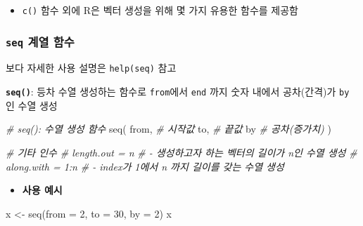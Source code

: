 \documentclass[
  11pt,
]{krantz}
\makeatletter
\newenvironment{Shaded}{\begin{snugshade}}{\end{snugshade}}
\newcommand{\AttributeTok}[1]{\textcolor[rgb]{0.61,0.61,0.61}{#1}}
\newcommand{\CommentTok}[1]{\textcolor[rgb]{0.37,0.37,0.37}{\textit{#1}}}
\newcommand{\DecValTok}[1]{\textcolor[rgb]{0.06,0.06,0.06}{#1}}
\newcommand{\FunctionTok}[1]{\textcolor[rgb]{0,0,0}{#1}}
\newcommand{\NormalTok}[1]{#1}
\newcommand{\OtherTok}[1]{\textcolor[rgb]{0.37,0.37,0.37}{#1}}
\providecommand{\tightlist}{%
  \setlength{\itemsep}{0pt}\setlength{\parskip}{0pt}}
\newenvironment{kframe}{%
\medskip{}
\setlength{\fboxsep}{.8em}
 \def\at@end@of@kframe{}%
 \ifinner\ifhmode%
  \def\at@end@of@kframe{\end{minipage}}%
  \begin{minipage}{\columnwidth}%
 \fi\fi%
 \def\FrameCommand##1{\hskip\@totalleftmargin \hskip-\fboxsep
 \colorbox{shadecolor}{##1}\hskip-\fboxsep
     \hskip-\linewidth \hskip-\@totalleftmargin \hskip\columnwidth}%
 \MakeFramed {\advance\hsize-\width
   \@totalleftmargin\z@ \linewidth\hsize
   \@setminipage}}%
 {\par\unskip\endMakeFramed%
 \at@end@of@kframe}
\renewenvironment{quote}{\begin{kframe}}{\end{kframe}}
\makeatother
\begin{document}
\begin{itemize}
\tightlist
\item
  \texttt{c()} 함수 외에 R은 벡터 생성을 위해 몇 가지 유용한 함수를 제공함
\end{itemize}

\hypertarget{fun-seq}{%
\subsubsection*{\texorpdfstring{\textbf{\texttt{seq}} 계열 함수}{seq 계열 함수}}\label{fun-seq}}


\begin{quote}
보다 자세한 사용 설명은 \texttt{help(seq)} 참고
\end{quote}

\textbf{\texttt{seq()}}: 등차 수열 생성하는 함수로 \texttt{from}에서 \texttt{end} 까지 숫자 내에서 공차(간격)가 \texttt{by} 인 수열 생성

\footnotesize

\begin{Shaded}
\begin{Highlighting}[]
\CommentTok{\# seq(): 수열 생성 함수}
\FunctionTok{seq}\NormalTok{(}
\NormalTok{  from, }\CommentTok{\# 시작값}
\NormalTok{  to,   }\CommentTok{\# 끝값}
\NormalTok{  by    }\CommentTok{\# 공차(증가치)}
\NormalTok{)}

\CommentTok{\# 기타 인수}
\CommentTok{\# length.out = n}
\CommentTok{\#   {-} 생성하고자 하는 벡터의 길이가 n인 수열 생성}
\CommentTok{\# along.with = 1:n }
\CommentTok{\#   {-} index가 1에서 n 까지 길이를 갖는 수열 생성}
\end{Highlighting}
\end{Shaded}

\normalsize

\begin{itemize}
\tightlist
\item
  \textbf{사용 예시}
\end{itemize}

\footnotesize

\begin{Shaded}
\begin{Highlighting}[]
\NormalTok{x }\OtherTok{\textless{}{-}} \FunctionTok{seq}\NormalTok{(}\AttributeTok{from =} \DecValTok{2}\NormalTok{, }\AttributeTok{to =} \DecValTok{30}\NormalTok{, }\AttributeTok{by =} \DecValTok{2}\NormalTok{)}
\NormalTok{x }
\end{Highlighting}
\end{Shaded}
\end{document}

